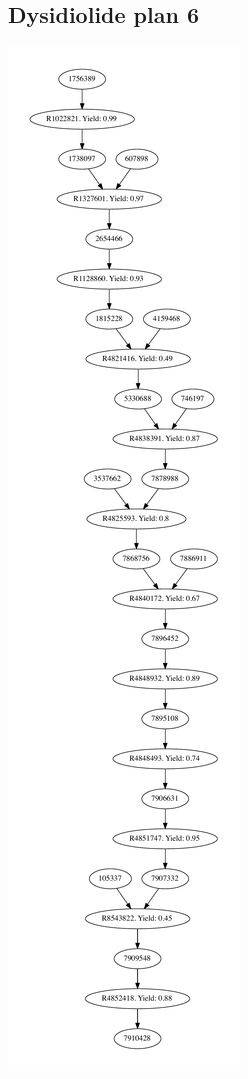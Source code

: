 \documentclass[a4paper,10pt,titlepage]{paper}
\begin{document}
\subsection{Dysidiolide plan 6}
\centering
\includegraphics[scale=0.3]{Synteseplaner/Dysidiolide/plan6.pdf}
\label{Appendix::Dysidiolide6}
\end{document}
